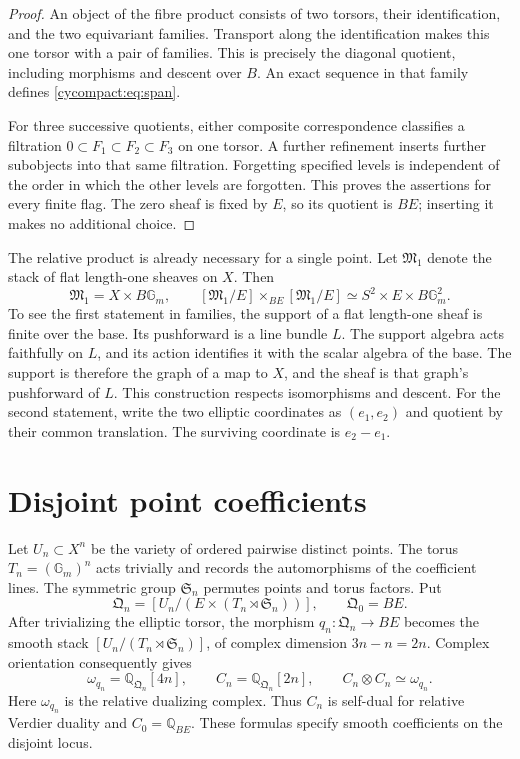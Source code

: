 \begin{proof}
An object of the fibre product consists of two torsors, their
identification, and the two equivariant families. Transport along
the identification makes this one torsor with a pair of families.
This is precisely the diagonal quotient, including morphisms and
descent over $B$. An exact sequence in that family defines
\eqref{cycompact:eq:span}.

For three successive quotients, either composite correspondence
classifies a filtration $0\subset F_1\subset F_2\subset F_3$ on
one torsor. A further refinement inserts further subobjects into
that same filtration. Forgetting specified levels is independent
of the order in which the other levels are forgotten. This proves
the assertions for every finite flag. The zero sheaf is fixed by
$E$, so its quotient is $BE$; inserting it makes no additional
choice.
\end{proof}

The relative product is already necessary for a single point.
Let $\mathfrak M_1$ denote the stack of flat length-one sheaves on
$X$. Then
\begin{equation}\label{cycompact:eq:point-stack}
 \mathfrak M_1=X\times B\mathbb G_m,\qquad
 [\mathfrak M_1/E]\times_{BE}[\mathfrak M_1/E]
 \simeq S^2\times E\times B\mathbb G_m^2.
\end{equation}
To see the first statement in families, the support of a flat
length-one sheaf is finite over the base. Its pushforward is a
line bundle $L$. The support algebra acts faithfully on $L$,
and its action identifies it with the scalar algebra of the base.
The support is therefore the graph of a map to $X$, and the sheaf
is that graph's pushforward of $L$. This construction respects
isomorphisms and descent. For the second statement, write the two
elliptic coordinates as $(e_1,e_2)$ and quotient by their common
translation. The surviving coordinate is $e_2-e_1$.

\section{Disjoint point coefficients}
\label{cycompact:sec:disjoint}

Let $U_n\subset X^n$ be the variety of ordered pairwise distinct
points. The torus $T_n=(\mathbb G_m)^n$ acts trivially and records
the automorphisms of the coefficient lines. The symmetric group
$\mathfrak S_n$ permutes points and torus factors. Put
\[
 \mathfrak Q_n=[U_n/(E\times(T_n\rtimes\mathfrak S_n))],
 \qquad \mathfrak Q_0=BE.
\]
After trivializing the elliptic torsor, the morphism
$q_n:\mathfrak Q_n\to BE$ becomes the smooth stack
$[U_n/(T_n\rtimes\mathfrak S_n)]$, of complex dimension
$3n-n=2n$. Complex orientation consequently gives
\begin{equation}\label{cycompact:eq:disjoint-coefficients}
 \omega_{q_n}=\mathbb Q_{\mathfrak Q_n}[4n],\qquad
 C_n=\mathbb Q_{\mathfrak Q_n}[2n],\qquad
 C_n\otimes C_n\simeq\omega_{q_n}.
\end{equation}
Here $\omega_{q_n}$ is the relative dualizing complex. Thus $C_n$
is self-dual for relative Verdier duality and $C_0=\mathbb Q_{BE}$.
These formulas specify smooth coefficients on the disjoint locus.

